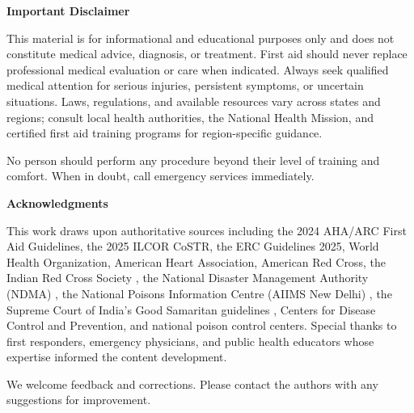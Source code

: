 \documentclass[12pt]{book}
\begin{document}
\textbf{Important Disclaimer}

This material is for informational and educational purposes only and does not constitute medical advice, diagnosis, or treatment. First aid should never replace professional medical evaluation or care when indicated. Always seek qualified medical attention for serious injuries, persistent symptoms, or uncertain situations. Laws, regulations, and available resources vary across states and regions; consult local health authorities, the National Health Mission, and certified first aid training programs for region-specific guidance.

No person should perform any procedure beyond their level of training and comfort. When in doubt, call emergency services immediately.

\textbf{Acknowledgments}

This work draws upon authoritative sources including the 2024 AHA/ARC First Aid Guidelines, the 2025 ILCOR CoSTR, the ERC Guidelines 2025, World Health Organization, American Heart Association, American Red Cross, the Indian Red Cross Society \cite{ircs}, the National Disaster Management Authority (NDMA) \cite{ndma}, the National Poisons Information Centre (AIIMS New Delhi) \cite{npic}, the Supreme Court of India's Good Samaritan guidelines \cite{sc_goodsam}, Centers for Disease Control and Prevention, and national poison control centers. Special thanks to first responders, emergency physicians, and public health educators whose expertise informed the content development.

We welcome feedback and corrections. Please contact the authors with any suggestions for improvement.


\mainmatter














\appendix




\backmatter



\printindex
\end{document}

